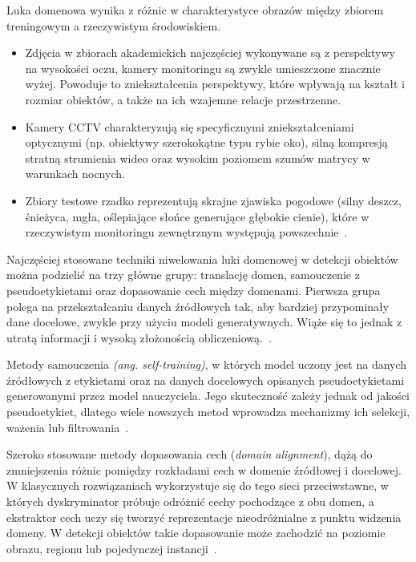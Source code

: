 Luka domenowa wynika z różnic w charakterystyce obrazów między zbiorem treningowym a rzeczywistym
środowiskiem.
\begin{itemize}
  \item Zdjęcia w zbiorach akademickich najczęściej wykonywane są z perspektywy na wysokości oczu, kamery
        monitoringu są zwykle umieszczone znacznie wyżej. Powoduje to zniekształcenia perspektywy, które
        wpływają na kształt i rozmiar obiektów, a także na ich wzajemne relacje przestrzenne.
  \item Kamery CCTV charakteryzują się specyficznymi zniekształceniami optycznymi (np. obiektywy
        szerokokątne typu rybie oko), silną kompresją stratną strumienia wideo oraz wysokim poziomem szumów
        matrycy w warunkach nocnych.
  \item Zbiory testowe rzadko reprezentują skrajne zjawiska pogodowe (silny deszcz, śnieżyca, mgła,
        oślepiające słońce generujące głębokie cienie), które w rzeczywistym monitoringu zewnętrznym
        występują powszechnie~\cite{he2024}.
\end{itemize}

Najczęściej stosowane techniki niwelowania luki domenowej w detekcji obiektów można podzielić na
trzy główne grupy: translację domen, samouczenie z pseudoetykietami oraz dopasowanie cech między
domenami. Pierwsza grupa polega na przekształcaniu danych źródłowych tak, aby bardziej przypominały
dane docelowe, zwykle przy użyciu modeli generatywnych. Wiąże się to jednak z utratą informacji i
wysoką złożonością obliczeniową.~\cite{he2024}.

Metody samouczenia \textit{(ang. self-training)}, w których model uczony jest na danych źródłowych
z etykietami oraz na danych docelowych opisanych pseudoetykietami generowanymi przez model
nauczyciela. Jego skuteczność zależy jednak od jakości pseudoetykiet, dlatego wiele nowszych metod
wprowadza mechanizmy ich selekcji, ważenia lub filtrowania~\cite{he2024}.

Szeroko stosowane metody dopasowania cech (\textit{domain alignment}), dążą do zmniejszenia różnic
pomiędzy rozkładami cech w domenie źródłowej i docelowej. W klasycznych rozwiązaniach wykorzystuje
się do tego sieci przeciwstawne, w których dyskryminator próbuje odróżnić cechy pochodzące z obu
domen, a ekstraktor cech uczy się tworzyć reprezentacje nieodróżnialne z punktu widzenia domeny. W
detekcji obiektów takie dopasowanie może zachodzić na poziomie obrazu, regionu lub pojedynczej
instancji~\cite{chen2018, he2024}.


